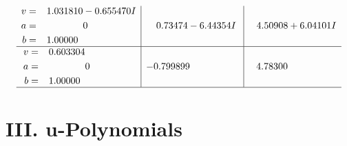 \documentclass[1p]{elsarticle_modified}
\theoremstyle{definition}
\begin{document}
$$\begin{array}{c|c|c}
\begin{aligned}
v &= \phantom{-}1.031810 - 0.655470 I \\
a &= \phantom{-0.000000 } 0 \\
b &= \phantom{-}1.00000\phantom{ +0.000000I}\end{aligned}
 & \phantom{-}0.73474 - 6.44354 I & \phantom{-}4.50908 + 6.04101 I \\ \hline\begin{aligned}
v &= \phantom{-}0.603304\phantom{ +0.000000I} \\
a &= \phantom{-0.000000 } 0 \\
b &= \phantom{-}1.00000\phantom{ +0.000000I}\end{aligned}
 & -0.799899\phantom{ +0.000000I} & \phantom{-}4.78300\phantom{ +0.000000I}\\
 \hline 
 \end{array}$$\newpage
\newpage\renewcommand{\arraystretch}{1}
\centering \section*{ III. u-Polynomials}
\end{document}
